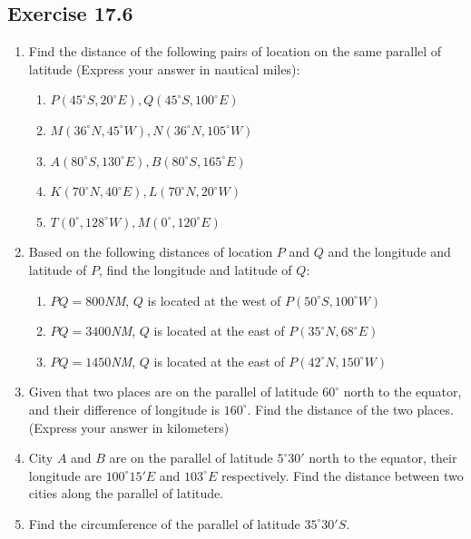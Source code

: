 \documentclass{report}
\begin{document}
\begin{multicols}{2}
    \subsection{Exercise 17.6}
    \begin{enumerate}
        \item Find the distance of the following pairs of location on the same parallel of
              latitude (Express your answer in nautical miles):
              \begin{enumerate}
                  \item $P(45^\circ S, 20^\circ E), Q(45^\circ S, 100^\circ E)$
                  \item $M(36^\circ N, 45^\circ W), N(36^\circ N, 105^\circ W)$
                  \item $A(80^\circ S, 130^\circ E), B(80^\circ S, 165^\circ E)$
                  \item $K(70^\circ N, 40^\circ E), L(70^\circ N, 20^\circ W)$
                  \item $T(0^\circ, 128^\circ W), M(0^\circ, 120^\circ E)$
              \end{enumerate}
        \item Based on the following distances of location $P$ and $Q$ and the longitude and
              latitude of $P$, find the longitude and latitude of $Q$:
              \begin{enumerate}
                  \item $PQ = 800$\emph{NM}, $Q$ is located at the west of $P(50^\circ S, 100^\circ W)$
                  \item $PQ = 3400$\emph{NM}, $Q$ is located at the east of $P(35^\circ N, 68^\circ E)$
                  \item $PQ = 1450$\emph{NM}, $Q$ is located at the east of $P(42^\circ N, 150^\circ W)$
              \end{enumerate}
        \item Given that two places are on the parallel of latitude $60^\circ$ north to the
              equator, and their difference of longitude is $160^\circ$. Find the distance of
              the two places. (Express your answer in kilometers)
        \item City $A$ and $B$ are on the parallel of latitude $5^\circ 30'$ north to the
              equator, their longitude are $100^\circ 15' E$ and $103^\circ E$ respectively.
              Find the distance between two cities along the parallel of latitude.
        \item Find the circumference of the parallel of latitude $35^\circ 30' S$.

\end{enumerate}
\end{multicols}
\end{document}
